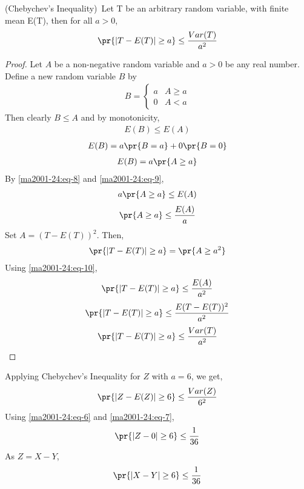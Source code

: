\begin{theorem}
(Chebychev's Inequality)\ Let T be an arbitrary random variable, with finite mean E(T), then for all $a>0$,
\begin{align}
    \pr{|T-E(T)| \geq a} \leq \dfrac{Var(T)}{a^2}
\end{align}
\end{theorem}
\begin{proof}
Let $A$ be a non-negative random variable and $a>0$ be any real number. Define a new random variable $B$ by
\begin{align}
B=  \begin{cases} 
          a & A \geq a \\
          0 & A < a
    \end{cases}
\end{align}
Then clearly $B \leq A$ and by monotonicity,
\begin{align} \label{ma2001-24:eq-8}
    E(B) \leq E(A)
\end{align}
\begin{align}
    E(B)=a\pr{B=a}+0\pr{B=0}
\end{align}
\begin{align} \label{ma2001-24:eq-9}
    E(B)=a\pr{A \geq a}
\end{align}
By \eqref{ma2001-24:eq-8} and \eqref{ma2001-24:eq-9},
\begin{align}
    a\pr{A \geq a} \leq  E(A)
\end{align}
\begin{align} \label{ma2001-24:eq-10}
    \pr{A \geq a} \leq \dfrac{E(A)}{a}
\end{align}
Set $A=(T-E(T))^2$. Then,
\begin{align}
    \pr{|T-E(T)| \geq a}=\pr{A \geq a^2}
\end{align}
Using \eqref{ma2001-24:eq-10},
\begin{align}
    \pr{|T-E(T)| \geq a} \leq \dfrac{E(A)}{a^2}
\end{align}
\begin{align}
    \pr{|T-E(T)| \geq a} \leq \dfrac{E(T-E(T))^2}{a^2}
\end{align}
\begin{align}
    \pr{|T-E(T)| \geq a} \leq \dfrac{Var(T)}{a^2}
\end{align}
\end{proof}
Applying Chebychev's Inequality for $Z$ with $a=6$, we get,
\begin{align}
    \pr{|Z-E(Z)| \geq 6} \leq \dfrac{Var(Z)}{6^2}
\end{align}
Using \eqref{ma2001-24:eq-6} and \eqref{ma2001-24:eq-7},
\begin{align}
    \pr{|Z-0| \geq 6} \leq \dfrac{1}{36}
\end{align}
As $Z=X-Y$,
\begin{align}
    \pr{|X-Y| \geq 6} \leq \dfrac{1}{36}
\end{align}